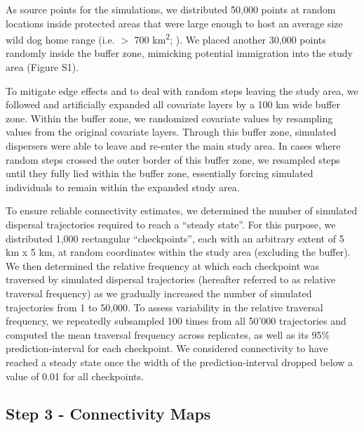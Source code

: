 \documentclass[abstract=on,10pt,a4paper,bibliography=totocnumbered]{article}
\begin{document}
As source points for the simulations, we distributed 50,000 points at random
locations inside protected areas that were large enough to host an average size
wild dog home range (i.e. \(>\) 700 km\textsuperscript{2};
\citealp{Pomilia.2015}). We placed another 30,000 points randomly inside the
buffer zone, mimicking potential immigration into the study area (Figure S1).

To mitigate edge effects and to deal with random steps leaving the study area,
we followed \cite{Koen.2010} and artificially expanded all covariate layers by a
100 km wide buffer zone. Within the buffer zone, we randomized covariate values
by resampling values from the original covariate layers. Through this buffer
zone, simulated dispersers were able to leave and re-enter the main study area.
In cases where random steps crossed the outer border of this buffer zone, we
resampled steps until they fully lied within the buffer zone, essentially
forcing simulated individuals to remain within the expanded study area.

To ensure reliable connectivity estimates, we determined the number of simulated
dispersal trajectories required to reach a ``steady state''. For this purpose,
we distributed 1,000 rectangular ``checkpoints'', each with an arbitrary extent
of 5 km x 5 km, at random coordinates within the study area (excluding the
buffer). We then determined the relative frequency at which each checkpoint was
traversed by simulated dispersal trajectories (hereafter referred to as relative
traversal frequency) as we gradually increased the number of simulated
trajectories from 1 to 50,000. To assess variability in the relative traversal
frequency, we repeatedly subsampled 100 times from all 50'000 trajectories and
computed the mean traversal frequency across replicates, as well as its 95\%
prediction-interval for each checkpoint. We considered connectivity to have
reached a steady state once the width of the prediction-interval dropped below a
value of 0.01 for all checkpoints.

\subsection{Step 3 - Connectivity Maps}
\end{document}
